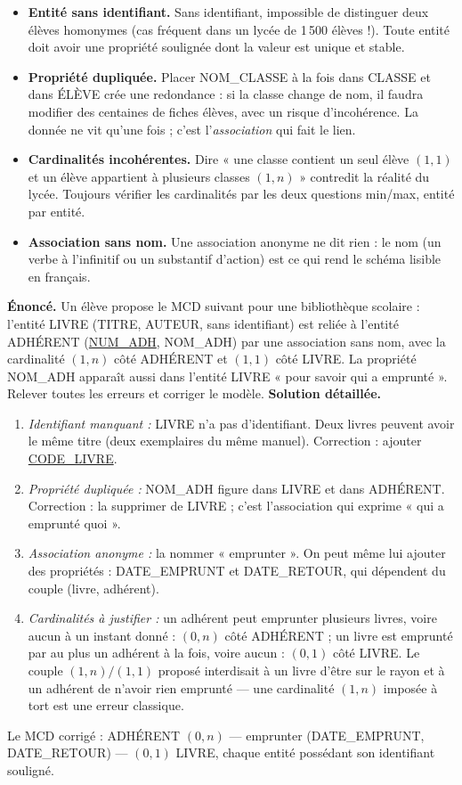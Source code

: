 \documentclass[11pt]{article}
\begin{document}
\begin{itemize}
\item \textbf{Entité sans identifiant.} Sans identifiant, impossible de distinguer deux élèves homonymes (cas fréquent dans un lycée de 1\,500 élèves !). Toute entité doit avoir une propriété soulignée dont la valeur est unique et stable.
\item \textbf{Propriété dupliquée.} Placer NOM\_CLASSE à la fois dans CLASSE et dans ÉLÈVE crée une redondance : si la classe change de nom, il faudra modifier des centaines de fiches élèves, avec un risque d'incohérence. La donnée ne vit qu'une fois ; c'est l'\emph{association} qui fait le lien.
\item \textbf{Cardinalités incohérentes.} Dire « une classe contient un seul élève $(1,1)$ et un élève appartient à plusieurs classes $(1,n)$ » contredit la réalité du lycée. Toujours vérifier les cardinalités par les deux questions min/max, entité par entité.
\item \textbf{Association sans nom.} Une association anonyme ne dit rien : le nom (un verbe à l'infinitif ou un substantif d'action) est ce qui rend le schéma lisible en français.
\end{itemize}

\begin{exoresolu}
\textbf{Énoncé.} Un élève propose le MCD suivant pour une bibliothèque scolaire : l'entité LIVRE (TITRE, AUTEUR, sans identifiant) est reliée à l'entité ADHÉRENT (\underline{NUM\_ADH}, NOM\_ADH) par une association sans nom, avec la cardinalité $(1,n)$ côté ADHÉRENT et $(1,1)$ côté LIVRE. La propriété NOM\_ADH apparaît aussi dans l'entité LIVRE « pour savoir qui a emprunté ». Relever toutes les erreurs et corriger le modèle.
\tcblower
\textbf{Solution détaillée.}
\begin{enumerate}
\item \emph{Identifiant manquant :} LIVRE n'a pas d'identifiant. Deux livres peuvent avoir le même titre (deux exemplaires du même manuel). Correction : ajouter \underline{CODE\_LIVRE}.
\item \emph{Propriété dupliquée :} NOM\_ADH figure dans LIVRE et dans ADHÉRENT. Correction : la supprimer de LIVRE ; c'est l'association qui exprime « qui a emprunté quoi ».
\item \emph{Association anonyme :} la nommer « emprunter ». On peut même lui ajouter des propriétés : DATE\_EMPRUNT et DATE\_RETOUR, qui dépendent du couple (livre, adhérent).
\item \emph{Cardinalités à justifier :} un adhérent peut emprunter plusieurs livres, voire aucun à un instant donné : $(0,n)$ côté ADHÉRENT ; un livre est emprunté par au plus un adhérent à la fois, voire aucun : $(0,1)$ côté LIVRE. Le couple $(1,n)/(1,1)$ proposé interdisait à un livre d'être sur le rayon et à un adhérent de n'avoir rien emprunté — une cardinalité $(1,n)$ imposée à tort est une erreur classique.
\end{enumerate}
Le MCD corrigé : ADHÉRENT $(0,n)$ --- emprunter (DATE\_EMPRUNT, DATE\_RETOUR) --- $(0,1)$ LIVRE, chaque entité possédant son identifiant souligné.
\end{exoresolu}
\end{document}
